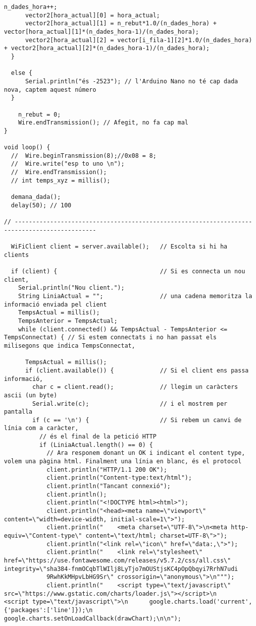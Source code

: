 \begin{lstlisting}[style=myArduino]
      n_dades_hora++;
      vector2[hora_actual][0] = hora_actual;
      vector2[hora_actual][1] = n_rebut*1.0/(n_dades_hora) + vector[hora_actual][1]*(n_dades_hora-1)/(n_dades_hora);
      vector2[hora_actual][2] = vector[i_fila-1][2]*1.0/(n_dades_hora) + vector2[hora_actual][2]*(n_dades_hora-1)/(n_dades_hora);
  }
    
  else {
      Serial.println("és -2523"); // l'Arduino Nano no té cap dada nova, captem aquest número
  }

    n_rebut = 0;
    Wire.endTransmission(); // Afegit, no fa cap mal
}

void loop() {
  //  Wire.beginTransmission(8);//0x08 = 8;
  //  Wire.write("esp to uno \n");
  //  Wire.endTransmission();
  // int temps_xyz = millis();
  
  demana_dada();
  delay(50); // 100

// ---------------------------------------------------------------------------------------------

  WiFiClient client = server.available();   // Escolta si hi ha clients

  if (client) {                             // Si es connecta un nou client,
    Serial.println("Nou client.");
    String LiniaActual = "";                // una cadena memoritza la informació enviada pel client
    TempsActual = millis();
    TempsAnterior = TempsActual;
    while (client.connected() && TempsActual - TempsAnterior <= TempsConnectat) { // Si estem connectats i no han passat els milisegons que indica TempsConnectat,

      TempsActual = millis();
      if (client.available()) {             // Si el client ens passa informació,
        char c = client.read();             // llegim un caràcters ascii (un byte)
        Serial.write(c);                    // i el mostrem per pantalla
        if (c == '\n') {                    // Si rebem un canvi de línia com a caràcter,
          // és el final de la petició HTTP
          if (LiniaActual.length() == 0) {
            // Ara responem donant un OK i indicant el content type, volem una pàgina html. Finalment una línia en blanc, és el protocol
            client.println("HTTP/1.1 200 OK");
            client.println("Content-type:text/html");
            client.println("Tancant connexió");
            client.println();
            client.println("<!DOCTYPE html><html>");
            client.println("<head><meta name=\"viewport\" content=\"width=device-width, initial-scale=1\">");
            client.println("    <meta charset=\"UTF-8\">\n<meta http-equiv=\"Content-type\" content=\"text/html; charset=UTF-8\">");
            client.println("<link rel=\"icon\" href=\"data:,\">");
            client.println("    <link rel=\"stylesheet\" href=\"https://use.fontawesome.com/releases/v5.7.2/css/all.css\" integrity=\"sha384-fnmOCqbTlWIlj8LyTjo7mOUStjsKC4pOpQbqyi7RrhN7udi
            9RwhKkMHpvLbHG9Sr\" crossorigin=\"anonymous\">\n""");
            client.println("    <script type=\"text/javascript\" src=\"https://www.gstatic.com/charts/loader.js\"></script>\n    <script type=\"text/javascript\">\n      google.charts.load('current', {'packages':['line']});\n      google.charts.setOnLoadCallback(drawChart);\n\n");
            

\end{lstlisting}
